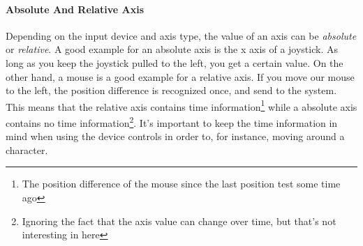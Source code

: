 \paragraph{Absolute And Relative Axis}
Depending on the input device and axis type, the value of an axis can be \emph{absolute} or \emph{relative}. A good example for an absolute axis is the x axis of a joystick. As long as you keep the joystick pulled to the left, you get a certain value. On the other hand, a mouse is a good example for a relative axis. If you move our mouse to the left, the position difference is recognized once, and send to the system. This means that the relative axis contains time information\footnote{The position difference of the mouse since the last position test some time ago} while a absolute axis contains no time information\footnote{Ignoring the fact that the axis value can change over time, but that's not interesting in here}. It's important to keep the time information in mind when using the device controls in order to, for instance, moving around a character.





\cleardoublepage

\cleardoublepage
